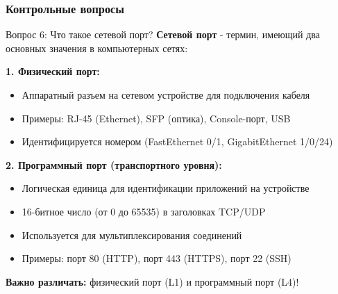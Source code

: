 \begin{frame}
\frametitle{Контрольные вопросы}
\begin{block}{Вопрос 6: Что такое сетевой порт?}
\textbf{Сетевой порт} - термин, имеющий два основных значения в компьютерных сетях:
\vspace{0.2cm}

\textbf{1. Физический порт:}
\begin{itemize}
    \item Аппаратный разъем на сетевом устройстве для подключения кабеля
    \item Примеры: RJ-45 (Ethernet), SFP (оптика), Console-порт, USB
    \item Идентифицируется номером (FastEthernet 0/1, GigabitEthernet 1/0/24)
\end{itemize}

\textbf{2. Программный порт (транспортного уровня):}
\begin{itemize}
    \item Логическая единица для идентификации приложений на устройстве
    \item 16-битное число (от 0 до 65535) в заголовках TCP/UDP
    \item Используется для мультиплексирования соединений
    \item Примеры: порт 80 (HTTP), порт 443 (HTTPS), порт 22 (SSH)
\end{itemize}

\textbf{Важно различать:} физический порт (L1) и программный порт (L4)!
\end{block}
\end{frame}

